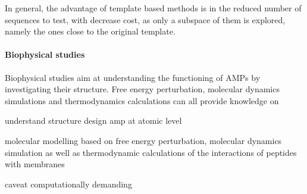 \documentclass[a4paper,11pt]{extreport}
\begin{document}
In general, the advantage of template based methods is in the reduced number of sequences to test, with decrease cost, as only a subspace of them is explored, namely the ones close to the original template.


\paragraph{Biophysical studies}
Biophysical studies aim at understanding the functioning of AMPs by investigating their structure. Free energy perturbation, molecular dynamics simulations and thermodynamics calculations can all provide knowledge on 


understand structure
design amp at atomic level

molecular modelling based on free energy perturbation, molecular dynamics simulation as well as thermodynamic calculations of the interactions of peptides with membranes

caveat computationally demanding
\end{document}
